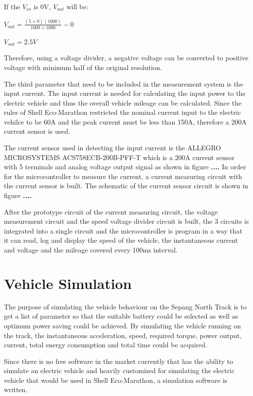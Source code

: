 If the \textit{$V_{in}$} is 0V, \textit{$V_{out}$} will be:

\centerline{$V_{out} = \frac{(5+0)(1000)}{1000+1000} - 0$}
\centerline{$V_{out} = 2.5V$}

Therefore, using a voltage divider, a negative voltage can be converted to positive voltage with minimum half of the original resolution.

The third parameter that need to be included in the measurement system is the input current. The input current is needed for calculating the input power to the electric vehicle and thus the overall vehicle mileage can be calculated. Since the rules of Shell Eco-Marathon restricted the nominal current input to the electric vehilce to be 60A and the peak current must be less than 150A, therefore a 200A current sensor is used.

The current sensor used in detecting the input current is the ALLEGRO MICROSYSTEMS ACS758ECB-200B-PFF-T which is a 200A current sensor with 5 terminals and analog voltage output signal as shown in figure \textbf{....} In order for the microcontroller to measure the current, a current measuring circuit with the current sensor is built. The schematic of the current sensor circuit is shown in figure \textbf{....}

After the prototype circuit of the current measuring circuit, the voltage measurement circuit and the speed voltage divider circuit is built, the 3 circuits is integrated into a single circuit and the microcontroller is program in a way that it can read, log and display the speed of the vehicle, the instantaneous current and voltage and the mileage covered every 100ms interval.

\section{Vehicle Simulation}
The purpose of simulating the vehicle behaviour on the Sepang North Track is to get a list of parameter so that the suitable battery could be selected as well as optimum power saving could be achieved. By simulating the vehicle running on the track, the instantaneous acceleration, speed, required torque, power output, current, total energy consumption and total time could be acquired.

Since there is no free software in the market currently that has the ability to simulate an electric vehicle and heavily customized for simulating the electric vehicle that would be used in Shell Eco-Marathon, a simulation software is written. 

